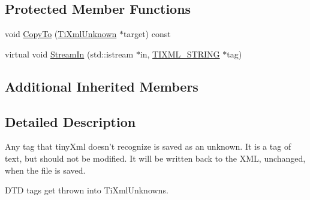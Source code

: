 \subsection*{Protected Member Functions}
\begin{DoxyCompactItemize}
\item 
void \hyperlink{class_ti_xml_unknown_a08ca7b225a2bcb604d3c72e199d33408}{Copy\-To} (\hyperlink{class_ti_xml_unknown}{Ti\-Xml\-Unknown} $\ast$target) const 
\item 
virtual void \hyperlink{class_ti_xml_unknown_adf84a317816124a2d7c7947d36170458}{Stream\-In} (std\-::istream $\ast$in, \hyperlink{tinyxml_8h_a92bada05fd84d9a0c9a5bbe53de26887}{T\-I\-X\-M\-L\-\_\-\-S\-T\-R\-I\-N\-G} $\ast$tag)
\end{DoxyCompactItemize}
\subsection*{Additional Inherited Members}


\subsection{Detailed Description}
Any tag that tiny\-Xml doesn't recognize is saved as an unknown. It is a tag of text, but should not be modified. It will be written back to the X\-M\-L, unchanged, when the file is saved.

D\-T\-D tags get thrown into Ti\-Xml\-Unknowns. 

